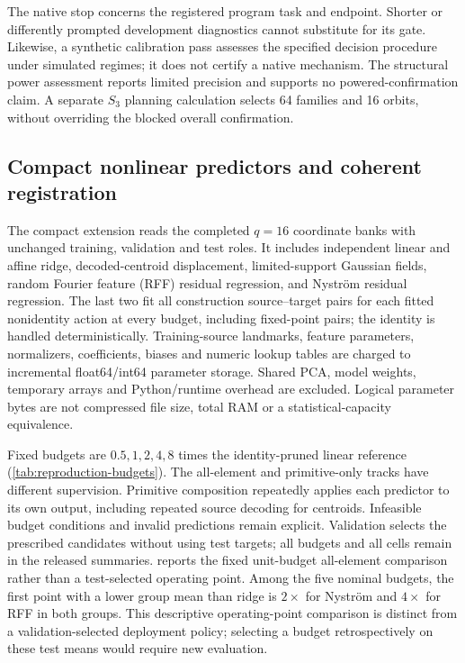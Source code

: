 The native stop concerns the registered program task and endpoint. Shorter or differently prompted development diagnostics cannot substitute for its gate. Likewise, a synthetic calibration pass assesses the specified decision procedure under simulated regimes; it does not certify a native mechanism. The structural power assessment reports limited precision and supports no powered-confirmation claim. A separate $S_3$ planning calculation selects 64 families and 16 orbits, without overriding the blocked overall confirmation.

\subsection{Compact nonlinear predictors and coherent registration}
The compact extension reads the completed $q=16$ coordinate banks with unchanged training, validation and test roles. It includes independent linear and affine ridge, decoded-centroid displacement, limited-support Gaussian fields, random Fourier feature (RFF) residual regression, and Nystr\"om residual regression. The last two fit all construction source--target pairs for each fitted nonidentity action at every budget, including fixed-point pairs; the identity is handled deterministically. Training-source landmarks, feature parameters, normalizers, coefficients, biases and numeric lookup tables are charged to incremental float64/int64 parameter storage. Shared PCA, model weights, temporary arrays and Python/runtime overhead are excluded. Logical parameter bytes are not compressed file size, total RAM or a statistical-capacity equivalence.



\FloatBarrier
Fixed budgets are $0.5,1,2,4,8$ times the identity-pruned linear reference (\cref{tab:reproduction-budgets}). The all-element and primitive-only tracks have different supervision. Primitive composition repeatedly applies each predictor to its own output, including repeated source decoding for centroids. Infeasible budget conditions and invalid predictions remain explicit. Validation selects the prescribed candidates without using test targets; all budgets and all cells remain in the released summaries.  reports the fixed unit-budget all-element comparison rather than a test-selected operating point. Among the five nominal budgets, the first point with a lower group mean than ridge is $2\times$ for Nystr\"om and $4\times$ for RFF in both groups. This descriptive operating-point comparison is distinct from a validation-selected deployment policy; selecting a budget retrospectively on these test means would require new evaluation.

